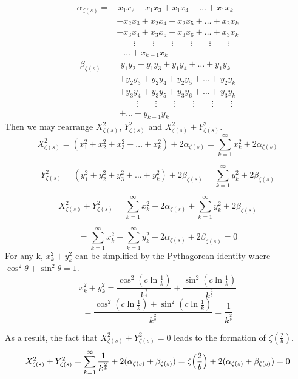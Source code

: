\documentclass{amsart}
\begin{document}
	\[
	\begin{aligned}
		\alpha_{\zeta(s)} =& \, x_1x_2 + x_1x_3 + x_1x_4 + \dots + x_{1}x_{k} \\
		& + x_2x_3 + x_2x_4 + x_2x_5 + \dots + x_2x_{k} \\
		& + x_3x_4 + x_3x_5 + x_3x_6 + \dots + x_3x_{k} \\
		& \qquad\vdots \qquad\vdots \qquad\vdots \qquad\vdots \qquad\vdots \qquad\vdots \\
		&  + \dots + x_{k-1}x_{k}
	\end{aligned}
	\]
	\[\]
	\[
	\begin{aligned}
		\beta_{\zeta(s)} =& \, y_1y_2 + y_1y_3 + y_1y_4 + \dots + y_{1}y_{k} \\
		& + y_2y_3 + y_2y_4 + y_2y_5 + \dots + y_2y_{k} \\
		& + y_3y_4 + y_3y_5 + y_3y_6 + \dots + y_3y_{k} \\
		& \qquad\vdots \qquad\vdots \qquad\vdots \qquad\vdots \qquad\vdots \qquad\vdots \\
		&  + \dots + y_{k-1}y_{k}
	\end{aligned}
	\]
	\[\]
	Then we may rearrange $X_{\zeta(s)}^2$, $Y_{\zeta(s)}^2$ and $X_{\zeta(s)}^2 + Y_{\zeta(s)}^2$.
	\[ X^2_{\zeta(s)} = (x_1^2 + x_2^2 + x_3^2 + \dots + x_k^2) + 2 \alpha_{\zeta(s)} = \sum\limits_{k=1}^{\infty}x_k^2 + 2 \alpha_{\zeta(s)} \]
	
	\[ Y^2_{\zeta(s)} = (y_1^2 + y_2^2 + y_3^2 + \dots + y_k^2) + 2 \beta_{\zeta(s)} = \sum\limits_{k=1}^{\infty}y_k^2 + 2 \beta_{\zeta(s)} \]
	
	\[ X^2_{\zeta(s)} + Y^2_{\zeta(s)} = \sum\limits_{k=1}^{\infty}x_k^2 + 2\alpha_{\zeta(s)} + \sum\limits_{k=1}^{\infty}y_k^2 + 2\beta_{\zeta(s)} \]
	
	\[ = \sum\limits_{k=1}^{\infty}x_k^2 + \sum\limits_{k=1}^{\infty}y_k^2 + 2\alpha_{\zeta(s)} +  2\beta_{\zeta(s)} = 0 \]
	\[\]
	For any k, $x_k^2 + y_k^2$ can be simplified by the Pythagorean identity where $\cos^2\theta + \sin^2\theta=1$.
	\[ x_k^2 + y_k^2 = \frac{\cos^2(c \ln \frac{1}{k})}{k^{\frac{2}{b}}} + \frac{\sin^2(c \ln \frac{1}{k})}{k^{\frac{2}{b}}} \]
	\[ = \frac{\cos^2(c \ln \frac{1}{k}) + \sin^2(c \ln \frac{1}{k})}{k^{\frac{2}{b}}} = \frac{1}{k^{\frac{2}{b}}} \]
	
	
	\[\]
	As a result, the fact that $X_{\zeta(s)}^2 + Y_{\zeta(s)}^2 = 0$ leads to the formation of $\zeta(\frac{2}{b})$.
	\[ X^2_{\zeta(s)} + Y^2_{\zeta(s)} = \sum\limits_{k=1}^{\infty}\frac{1}{k^{\frac{2}{b}}} + 2(\alpha_{\zeta(s)} + \beta_{\zeta(s)}) = \zeta\Bigl( \frac{2}{b} \Bigr) + 2(\alpha_{\zeta(s)} + \beta_{\zeta(s)}) = 0 \]
	
\end{document}
